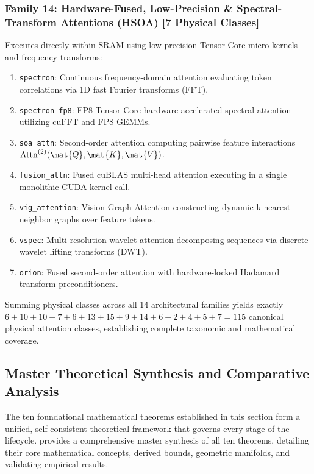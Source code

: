 \subsubsection{Family 14: Hardware-Fused, Low-Precision \& Spectral-Transform Attentions (HSOA) [7 Physical Classes]}
Executes directly within SRAM using low-precision Tensor Core micro-kernels and frequency transforms:
\begin{enumerate}
    \item \texttt{spectron}: Continuous frequency-domain attention evaluating token correlations via 1D fast Fourier transforms (FFT).
    \item \texttt{spectron\_fp8}: FP8 Tensor Core hardware-accelerated spectral attention utilizing cuFFT and FP8 GEMMs.
    \item \texttt{soa\_attn}: Second-order attention computing pairwise feature interactions $\operatorname{Attn}^{(2)}(\mat{Q}, \mat{K}, \mat{V})$.
    \item \texttt{fusion\_attn}: Fused cuBLAS multi-head attention executing in a single monolithic CUDA kernel call.
    \item \texttt{vig\_attention}: Vision Graph Attention constructing dynamic k-nearest-neighbor graphs over feature tokens.
    \item \texttt{vspec}: Multi-resolution wavelet attention decomposing sequences via discrete wavelet lifting transforms (DWT).
    \item \texttt{orion}: Fused second-order attention with hardware-locked Hadamard transform preconditioners.
\end{enumerate}

Summing physical classes across all 14 architectural families yields exactly $6 + 10 + 10 + 7 + 6 + 13 + 15 + 9 + 14 + 6 + 2 + 4 + 5 + 7 = 115$ canonical physical attention classes, establishing complete taxonomic and mathematical coverage.

\subsection{Master Theoretical Synthesis and Comparative Analysis}
\label{sec:theorems_master_summary}

The ten foundational mathematical theorems established in this section form a unified, self-consistent theoretical framework that governs every stage of the \neuralops{} lifecycle.  provides a comprehensive master synthesis of all ten theorems, detailing their core mathematical concepts, derived bounds, geometric manifolds, and validating empirical results.


